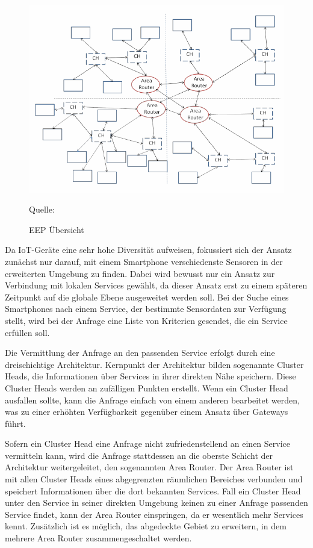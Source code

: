 \documentclass[conference,compsoc]{IEEEtran}
\begin{document}
\begin{figure}
\centering
\includegraphics[scale=0.45]{EEP.png}
\caption{EEP Übersicht}
\label{EEPBild}
Quelle: \cite{energy-efficient}
\end{figure}

Da IoT-Geräte eine sehr hohe Diversität aufweisen, fokussiert sich der Ansatz zunächst nur darauf, mit einem Smartphone verschiedenste Sensoren in der erweiterten Umgebung zu finden. Dabei wird bewusst nur ein Ansatz zur Verbindung mit lokalen Services gewählt, da dieser Ansatz erst zu einem späteren Zeitpunkt auf die globale Ebene ausgeweitet werden soll. Bei der Suche eines Smartphones nach einem Service, der bestimmte Sensordaten zur Verfügung stellt, wird bei der Anfrage eine Liste von Kriterien gesendet, die ein Service erfüllen soll.

Die Vermittlung der Anfrage an den passenden Service erfolgt durch eine dreischichtige Architektur. Kernpunkt der Architektur bilden sogenannte Cluster Heads, die Informationen über Services in ihrer direkten Nähe speichern. Diese Cluster Heads werden an zufälligen Punkten erstellt. Wenn ein Cluster Head ausfallen sollte, kann die Anfrage einfach von einem anderen bearbeitet werden, was zu einer erhöhten Verfügbarkeit gegenüber einem Ansatz über Gateways führt.

Sofern ein Cluster Head eine Anfrage nicht zufriedenstellend an einen Service vermitteln kann, wird die Anfrage stattdessen an die oberste Schicht der Architektur weitergeleitet, den sogenannten Area Router. Der Area Router ist mit allen Cluster Heads eines abgegrenzten räumlichen Bereiches verbunden und speichert Informationen über die dort bekannten Services. Fall ein Cluster Head unter den Service in seiner direkten Umgebung keinen zu einer Anfrage passenden Service findet, kann der Area Router einspringen, da er wesentlich mehr Services kennt. Zusätzlich ist es möglich, das abgedeckte Gebiet zu erweitern, in dem mehrere Area Router zusammengeschaltet werden.
\end{document}
